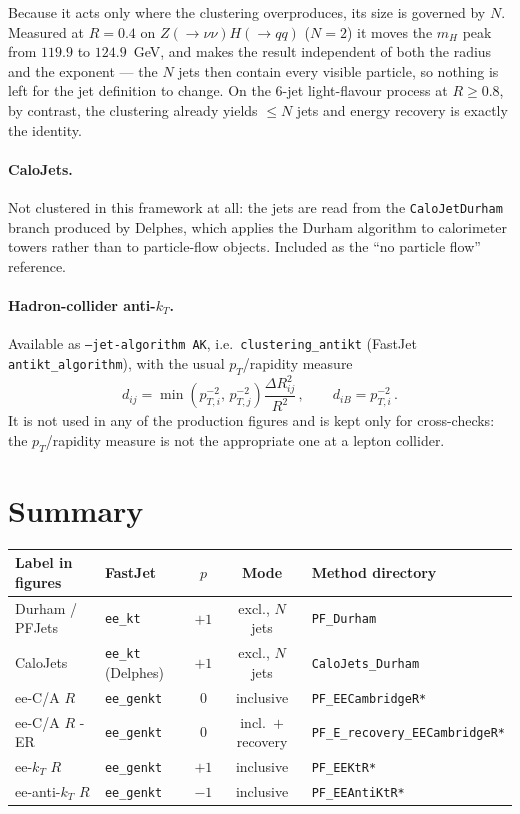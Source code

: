 \documentclass[11pt,a4paper]{article}
\newcommand{\dij}{d_{ij}}
\newcommand{\diB}{d_{iB}}
\begin{document}
Because it acts only where the clustering overproduces, its size is governed by
$N$. Measured at $R = 0.4$ on $Z(\to\nu\nu)H(\to qq)$ ($N = 2$) it moves the
$m_H$ peak from $119.9$ to $124.9$~GeV, and makes the result independent of both
the radius and the exponent --- the $N$ jets then contain every visible particle,
so nothing is left for the jet definition to change. On the 6-jet light-flavour
process at $R \ge 0.8$, by contrast, the clustering already yields $\le N$ jets
and energy recovery is exactly the identity.

\paragraph{CaloJets.}
Not clustered in this framework at all: the jets are read from the
\texttt{CaloJetDurham} branch produced by Delphes, which applies the Durham
algorithm to calorimeter towers rather than to particle-flow objects. Included
as the ``no particle flow'' reference.

\paragraph{Hadron-collider anti-$k_T$.}
Available as \texttt{--jet-algorithm AK}, i.e.\ \texttt{clustering\_antikt}
(FastJet \texttt{antikt\_algorithm}), with the usual $p_T$/rapidity measure
\[
  \dij = \min\!\left(p_{T,i}^{-2},\,p_{T,j}^{-2}\right)
         \frac{\Delta R_{ij}^2}{R^2}\,,
  \qquad
  \diB = p_{T,i}^{-2}\,.
\]
It is not used in any of the production figures and is kept only for
cross-checks: the $p_T$/rapidity measure is not the appropriate one at a lepton
collider.

\section*{Summary}

\begin{center}
\small
\begin{tabular}{@{}llccl@{}}
\toprule
Label in figures & FastJet & $p$ & Mode & Method directory \\
\midrule
Durham / PFJets & \texttt{ee\_kt} & $+1$ & excl., $N$ jets & \texttt{PF\_Durham} \\
CaloJets & \texttt{ee\_kt} (Delphes) & $+1$ & excl., $N$ jets & \texttt{CaloJets\_Durham} \\
ee-C/A $R$ & \texttt{ee\_genkt} & $0$ & inclusive & \texttt{PF\_EECambridgeR*} \\
ee-C/A $R$ -ER & \texttt{ee\_genkt} & $0$ & incl.\ $+$ recovery & \texttt{PF\_E\_recovery\_EECambridgeR*} \\
ee-$k_T$ $R$ & \texttt{ee\_genkt} & $+1$ & inclusive & \texttt{PF\_EEKtR*} \\
ee-anti-$k_T$ $R$ & \texttt{ee\_genkt} & $-1$ & inclusive & \texttt{PF\_EEAntiKtR*} \\
\bottomrule
\end{tabular}
\end{center}
\end{document}
